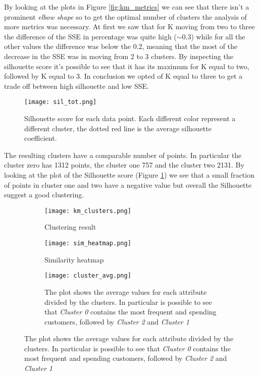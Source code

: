 \documentclass{article}
\begin{document}
By looking at the plots in Figure \ref{fig:km_metrics} we can see that there isn't a prominent \emph{elbow shape} so to get the optimal number of clusters the analysis of more metrics was necessary. At first we saw that for K moving from two to three the difference of the SSE in percentage was quite high ($\sim$0.3) while for all the other values the difference was below the 0.2, meaning that the most of the decrease in the SSE was in moving from 2 to 3 clusters. By inspecting the silhouette score it's possible to see that it has its maximum for K equal to two, followed by K equal to 3. In conclusion we opted of K equal to three to get a trade off between high silhouette and low SSE.

\begin{figure}[h!]
    \centering
    \texttt{[image: sil\_tot.png]}
    \caption{Silhouette score for each data point. Each different color represent a different cluster, the dotted red line is the average silhouette coefficient.}
    \label{fig:silhouette}
\end{figure}

The resulting clusters have a comparable number of points. In particular the cluster zero has 1312 points, the cluster one 757 and the cluster two 2131. By looking at the plot of the Silhouette score (Figure \ref{fig:silhouette}) we see that a small fraction of points in cluster one and two have a negative value but overall the Silhouette suggest a good clustering.

\begin{figure}[h!]
    \centering
    \begin{subfigure}{0.49\textwidth}
        \texttt{[image: km\_clusters.png]}
        \caption{Clustering result}
        \label{fig:skmclust}
    \end{subfigure}
    \begin{subfigure}{0.49\textwidth}
        \texttt{[image: sim\_heatmap.png]}
        \caption{Similarity heatmap}
        \label{fig:sim_heatmap}
    \end{subfigure}
    
    \begin{subfigure}{0.49\textwidth}
        \texttt{[image: cluster\_avg.png]}
        \caption{The plot shows the average values for each attribute divided by the clusters. In particular is possible to see that \emph{Cluster 0} contains the most frequent and spending customers, followed by \emph{Cluster 2} and \emph{Cluster 1}}
        \label{fig:km_avg}
    \end{subfigure}
\end{figure}
\end{document}
